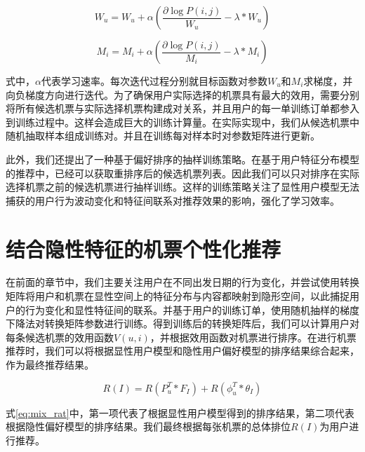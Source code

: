 \begin{equation}
	W_u = W_u + \alpha(\frac{\partial \log P(i,j)}{W_u} - \lambda*W_u)
\end{equation}

\begin{equation}
	M_i = M_i + \alpha(\frac{\partial \log P(i,j)}{M_i} - \lambda*M_i)
\end{equation}

式中，$\alpha$代表学习速率。每次迭代过程分别就目标函数对参数$W_u$和$M_i$求梯度，并向负梯度方向进行迭代。为了确保用户实际选择的机票具有最大的效用，需要分别将所有候选机票与实际选择机票构建成对关系，并且用户的每一单训练订单都参入到训练过程中。这样会造成巨大的训练计算量。在实际实现中，我们从候选机票中随机抽取样本组成训练对。并且在训练每对样本时对参数矩阵进行更新。

此外，我们还提出了一种基于偏好排序的抽样训练策略。在基于用户特征分布模型的推荐中，已经可以获取重排序后的候选机票列表。因此我们可以只对排序在实际选择机票之前的候选机票进行抽样训练。这样的训练策略关注了显性用户模型无法捕获的用户行为波动变化和特征间联系对推荐效果的影响，强化了学习效率。

\section{结合隐性特征的机票个性化推荐}

在前面的章节中，我们主要关注用户在不同出发日期的行为变化，并尝试使用转换矩阵将用户和机票在显性空间上的特征分布与内容都映射到隐形空间，以此捕捉用户的行为变化和显性特征间的联系。并基于用户的训练订单，使用随机抽样的梯度下降法对转换矩阵参数进行训练。得到训练后的转换矩阵后，我们可以计算用户对每条候选机票的效用函数$V(u,i)$，并根据效用函数对机票进行排序。在进行机票推荐时，我们可以将根据显性用户模型和隐性用户偏好模型的排序结果综合起来，作为最终推荐结果。

\begin{equation}
\label{eq:mix_rat}
	R(I) = R(P_u^T * F_I) + R(\phi_u^T * \theta_I)
\end{equation}

式\ref{eq:mix_rat}中，第一项代表了根据显性用户模型得到的排序结果，第二项代表根据隐性偏好模型的排序结果。我们最终根据每张机票的总体排位$R(I)$为用户进行推荐。

